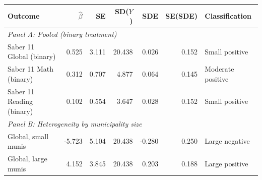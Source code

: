\begin{tabular}{lrrrrrl}
\toprule
 Outcome & $\hat{\beta}$ & SE & SD($Y$) & SDE & SE(SDE) & Classification \\
 \midrule
 \multicolumn{7}{l}{\textit{Panel A: Pooled (binary treatment)}} \\
Saber 11 Global (binary) & 0.525 & 3.111 & 20.438 & 0.026 & 0.152 & Small positive \\
Saber 11 Math (binary) & 0.312 & 0.707 & 4.877 & 0.064 & 0.145 & Moderate positive \\
Saber 11 Reading (binary) & 0.102 & 0.554 & 3.647 & 0.028 & 0.152 & Small positive \\
\midrule
 \multicolumn{7}{l}{\textit{Panel B: Heterogeneity by municipality size}} \\
Global, small munis & -5.723 & 5.104 & 20.438 & -0.280 & 0.250 & Large negative \\
Global, large munis & 4.152 & 3.845 & 20.438 & 0.203 & 0.188 & Large positive \\
\bottomrule
 \end{tabular}
